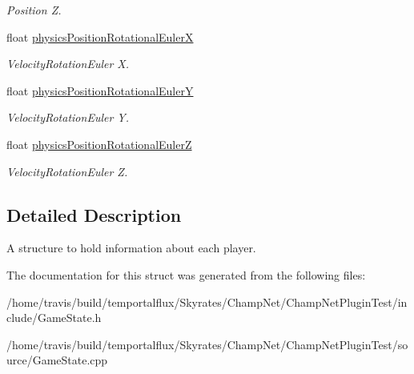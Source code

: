 \begin{DoxyCompactItemize}
\begin{DoxyCompactList}\small\item\em Position Z. \end{DoxyCompactList}\item 
\hypertarget{struct_game_state_1_1_client_a8d07f2646a2013223b6a1d29a48ee4f3}{float \hyperlink{struct_game_state_1_1_client_a8d07f2646a2013223b6a1d29a48ee4f3}{physics\-Position\-Rotational\-Euler\-X}}\label{struct_game_state_1_1_client_a8d07f2646a2013223b6a1d29a48ee4f3}

\begin{DoxyCompactList}\small\item\em Velocity\-Rotation\-Euler X. \end{DoxyCompactList}\item 
\hypertarget{struct_game_state_1_1_client_a6ebbe295a6e43d2bae98cf7f39317ed3}{float \hyperlink{struct_game_state_1_1_client_a6ebbe295a6e43d2bae98cf7f39317ed3}{physics\-Position\-Rotational\-Euler\-Y}}\label{struct_game_state_1_1_client_a6ebbe295a6e43d2bae98cf7f39317ed3}

\begin{DoxyCompactList}\small\item\em Velocity\-Rotation\-Euler Y. \end{DoxyCompactList}\item 
\hypertarget{struct_game_state_1_1_client_a663d14fe1f916ce854aff3bacbb8f4b3}{float \hyperlink{struct_game_state_1_1_client_a663d14fe1f916ce854aff3bacbb8f4b3}{physics\-Position\-Rotational\-Euler\-Z}}\label{struct_game_state_1_1_client_a663d14fe1f916ce854aff3bacbb8f4b3}

\begin{DoxyCompactList}\small\item\em Velocity\-Rotation\-Euler Z. \end{DoxyCompactList}\end{DoxyCompactItemize}


\subsection{Detailed Description}
A structure to hold information about each player. 

The documentation for this struct was generated from the following files\-:\begin{DoxyCompactItemize}
\item 
/home/travis/build/temportalflux/\-Skyrates/\-Champ\-Net/\-Champ\-Net\-Plugin\-Test/include/Game\-State.\-h\item 
/home/travis/build/temportalflux/\-Skyrates/\-Champ\-Net/\-Champ\-Net\-Plugin\-Test/source/Game\-State.\-cpp\end{DoxyCompactItemize}
